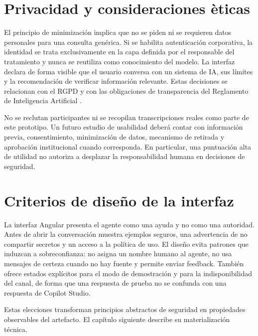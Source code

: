 \section{Privacidad y consideraciones \`eticas}

El principio de minimizaci\'on implica que no se piden ni se requieren datos personales para una consulta gen\'erica. Si se habilita autenticaci\'on corporativa, la identidad se trata exclusivamente en la capa definida por el responsable del tratamiento y nunca se reutiliza como conocimiento del modelo. La interfaz declara de forma visible que el usuario conversa con un sistema de IA, sus l\'imites y la recomendaci\'on de verificar informaci\'on relevante. Estas decisiones se relacionan con el RGPD \cite{gdpr} y con las obligaciones de transparencia del Reglamento de Inteligencia Artificial \cite{aiAct}.

No se reclutan participantes ni se recopilan transcripciones reales como parte de este prototipo. Un futuro estudio de usabilidad deber\'a contar con informaci\'on previa, consentimiento, minimizaci\'on de datos, mecanismo de retirada y aprobaci\'on institucional cuando corresponda. En particular, una puntuaci\'on alta de utilidad no autoriza a desplazar la responsabilidad humana en decisiones de seguridad.

\section{Criterios de dise\~no de la interfaz}

La interfaz Angular presenta el agente como una ayuda y no como una autoridad. Antes de abrir la conversaci\'on muestra ejemplos seguros, una advertencia de no compartir secretos y un acceso a la pol\'itica de uso. El dise\~no evita patrones que induzcan a sobreconfianza: no asigna un nombre humano al agente, no usa mensajes de certeza cuando no hay fuente y permite enviar feedback. Tambi\'en ofrece estados expl\'icitos para el modo de demostraci\'on y para la indisponibilidad del canal, de forma que una respuesta de prueba no se confunda con una respuesta de Copilot Studio.

Estas elecciones transforman principios abstractos de seguridad en propiedades observables del artefacto. El cap\'itulo siguiente describe su materializaci\'on t\'ecnica.
